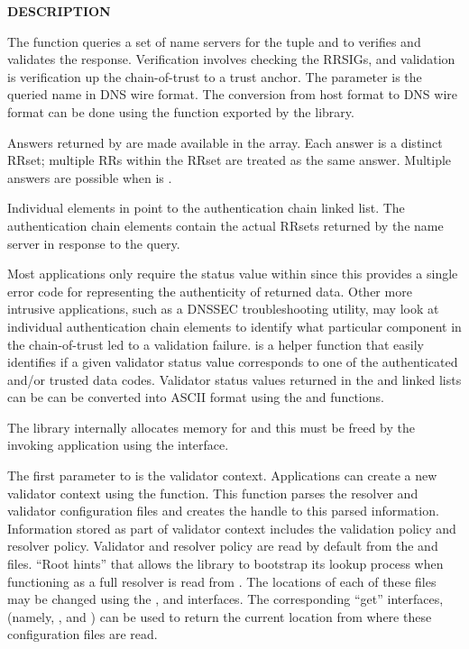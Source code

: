 {\bf DESCRIPTION}

The  function queries a set of name servers
for the  tuple and to verifies and
validates the response.  Verification involves checking the RRSIGs, and
validation is verification up the chain-of-trust to a trust anchor.  The
 parameter is the queried name in DNS wire format.  The
conversion from host format to DNS wire format can be done using the
 function exported by the  library.

Answers returned by  are made available in
the  array.  Each answer is a distinct RRset; multiple RRs
within the RRset are treated as the same answer.  Multiple answers are
possible when  is .

Individual elements in  point to the authentication chain linked
list.  The authentication chain elements contain the actual RRsets returned by
the name server in response to the query.

Most applications only require the status value within  since
this provides a single error code for representing the authenticity of
returned data.  Other more intrusive applications, such as a DNSSEC
troubleshooting utility, may look at individual authentication chain elements
to identify what particular component in the chain-of-trust led to a
validation failure.   is a helper function that easily
identifies if a given validator status value corresponds to one of the
authenticated and/or trusted data codes.  Validator status values returned in
the  and  linked lists
can be can be converted into ASCII format using the 
and  functions.

The  library internally allocates memory for  and
this must be freed by the invoking application using the
 interface.

The first parameter to  is the validator
context.  Applications can create a new validator context using the
 function.  This function parses the resolver and
validator configuration files and creates the handle  to this
parsed information.  Information stored as part of validator context includes
the validation policy and resolver policy.  Validator and resolver policy are
read by default from the  and 
files.  ``Root hints'' that allows the library to bootstrap its lookup process
when functioning as a full resolver is read from .  The
locations of each of these files may be changed using the
,  and
 interfaces.  The corresponding ``get'' interfaces,
(namely, ,  and
) can be used to return the current location from where
these configuration files are read.

